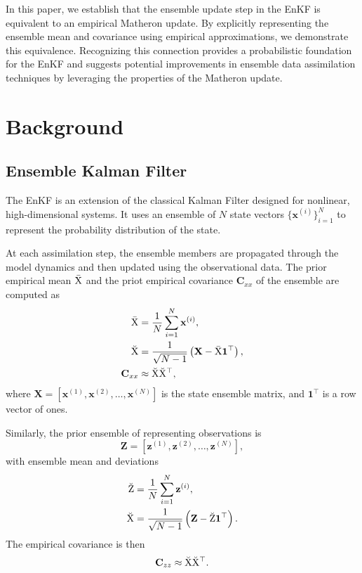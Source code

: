 \documentclass{article}
\theoremstyle{plain}
\begin{document}
In this paper, we establish that the ensemble update step in the EnKF is equivalent to an empirical Matheron update.
By explicitly representing the ensemble mean and covariance using empirical approximations, we demonstrate this equivalence.
Recognizing this connection provides a probabilistic foundation for the EnKF and suggests potential improvements in ensemble data assimilation techniques by leveraging the properties of the Matheron update.

\section{Background}

\subsection{Ensemble Kalman Filter}

The EnKF is an extension of the classical Kalman Filter designed for nonlinear, high-dimensional systems. It uses an ensemble of $N$ state vectors $\{\mathbf{x}^{(i)}\}_{i=1}^N$ to represent the probability distribution of the state.

At each assimilation step, the ensemble members are propagated through the model dynamics and then updated using the observational data. The prior empirical mean $\bar{\mathrm{X}}$ and the priot empirical covariance $\mathbf{C}_{xx}$ of the ensemble are computed as
\begin{align}
    \bar{\mathrm{X}} &= \frac{1}{N} \sum_{i=1}^N \mathbf{x}^{(i)}, \label{eq:ensemble_mean} \\
    \breve{\mathrm{X}} &= \frac{1}{\sqrt{N-1}} \left( \mathbf{X} - \bar{\mathrm{X}} \mathbf{1}^\top \right), \label{eq:deviation_matrix} \\
    \mathbf{C}_{xx} &\approx \breve{\mathrm{X}} \breve{\mathrm{X}}^\top, \label{eq:ensemble_covariance}
\end{align}
where $\mathbf{X} = [\mathbf{x}^{(1)}, \mathbf{x}^{(2)}, \dots, \mathbf{x}^{(N)}]$ is the state ensemble matrix, and $\mathbf{1}^\top$ is a row vector of ones.

Similarly, the prior ensemble of representing observations is
\begin{equation}
    \mathbf{Z} = [\mathbf{z}^{(1)}, \mathbf{z}^{(2)}, \dots, \mathbf{z}^{(N)}],
\end{equation}
with ensemble mean and deviations
\begin{align}
    \breve{\mathrm{Z}} &= \frac{1}{N} \sum_{i=1}^N \mathbf{z}^{(i)}, \\
    \breve{\mathrm{X}} &= \frac{1}{\sqrt{N-1}} \left( \mathbf{Z} - \breve{\mathrm{Z}} \mathbf{1}^\top \right).
\end{align}
The empirical covariance is then
\begin{equation}
    \mathbf{C}_{zz} \approx \breve{\mathrm{X}} \breve{\mathrm{X}}^\top.
\end{equation}
\end{document}
